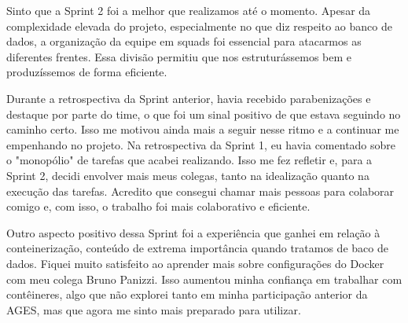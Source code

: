 \begin{reflection}
\indent \originaltab{}Sinto que a Sprint 2 foi a melhor que realizamos até o momento. Apesar da complexidade elevada do projeto, especialmente no que diz respeito ao banco de dados, a organização da equipe em squads foi essencial para atacarmos as diferentes frentes. Essa divisão permitiu que nos estruturássemos bem e produzíssemos de forma eficiente.\par

\indent \originaltab{}Durante a retrospectiva da Sprint anterior, havia recebido parabenizações e destaque por parte do time, o que foi um sinal positivo de que estava seguindo no caminho certo. Isso me motivou ainda mais a seguir nesse ritmo e a continuar me empenhando no projeto. Na retrospectiva da Sprint 1, eu havia comentado sobre o "monopólio" de tarefas que acabei realizando. Isso me fez refletir e, para a Sprint 2, decidi envolver mais meus colegas, tanto na idealização quanto na execução das tarefas. Acredito que consegui chamar mais pessoas para colaborar comigo e, com isso, o trabalho foi mais colaborativo e eficiente.\par

\indent \originaltab{}Outro aspecto positivo dessa Sprint foi a experiência que ganhei em relação à conteinerização, conteúdo de extrema importância quando tratamos de baco de dados. Fiquei muito satisfeito ao aprender mais sobre configurações do Docker com meu colega Bruno Panizzi. Isso aumentou minha confiança em trabalhar com contêineres, algo que não explorei tanto em minha participação anterior da AGES, mas que agora me sinto mais preparado para utilizar.\par

\end{reflection}
